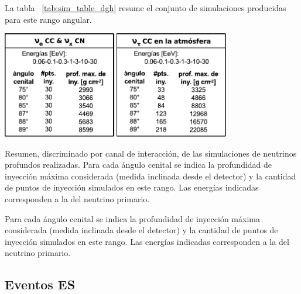 		La tabla ~\ref{tab:sim_table_dgh} resume el conjunto de simulaciones producidas para este rango angular.
		\begin{table}[ht]
		\begin{center}
		\includegraphics[width=0.75\textwidth]{fig/simulacionAuger/sim_table.pdf}
		\end{center}
		\caption{
		Resumen, discriminado por canal de interacción, de las simulaciones de neutrinos profundos realizadas.
		Para cada ángulo cenital se indica la profundidad de inyección máxima considerada (medida inclinada desde el detector) y la cantidad de puntos de inyección simulados en este rango. Las energías indicadas corresponden a la del neutrino primario.
		}
		\label{tab:sim_table_dgh}
		\end{table}
		Para cada ángulo cenital se indica la profundidad de inyección máxima considerada (medida inclinada desde el detector) y la cantidad de puntos de inyección simulados en este rango. Las energías indicadas corresponden a la del neutrino primario.
		
		\subsection{Eventos ES}
		
